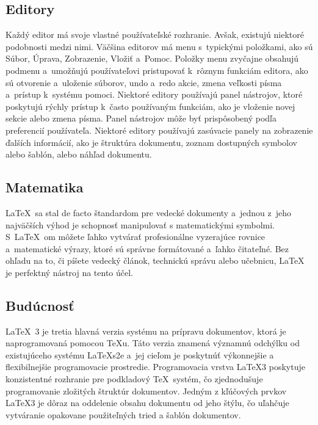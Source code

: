 \documentclass[a4paper, 11pt]{article}
\begin{document}
\subsection{Editory}
Každý editor má svoje vlastné používateľské rozhranie. Avšak, existujú niektoré podobnosti medzi nimi. Väčšina editorov má menu s~typickými položkami, ako sú Súbor, Úprava, Zobrazenie, Vložiť a~Pomoc. Položky menu zvyčajne obsahujú podmenu a~umožňujú používateľovi pristupovať k~rôznym funkciám editora, ako sú otvorenie a~uloženie súborov, undo a~redo akcie, zmena veľkosti písma a~prístup k~systému pomoci. Niektoré editory používajú panel nástrojov, ktoré poskytujú rýchly prístup k~často používaným funkciám, ako je vloženie novej sekcie alebo zmena písma. Panel nástrojov môže byť prispôsobený podľa preferencií používateľa. Niektoré editory používajú zasúvacie panely na zobrazenie ďalších informácií, ako je štruktúra dokumentu, zoznam dostupných symbolov alebo šablón, alebo náhľad dokumentu. \cite{HorejsiTomas2017}


\subsection{Matematika}
\LaTeX \ sa stal de facto štandardom pre vedecké dokumenty a~jednou z~jeho najväčších výhod je schopnosť manipulovať s matematickými symbolmi. S~\LaTeX \ om môžete ľahko vytvárať profesionálne vyzerajúce rovnice a~matematické výrazy, ktoré sú správne formátované a~ľahko čitateľné. Bez ohľadu na to, či píšete vedecký článok, technickú správu alebo učebnicu, LaTeX je perfektný nástroj na tento účel. \cite{WeiserTexMatematics}

\subsection{Budúcnosť}
\LaTeX \ 3 je tretia hlavná verzia systému na prípravu dokumentov, ktorá je naprogramovaná pomocou TeXu. Táto verzia znamená významnú odchýlku od existujúceho systému \LaTeX s2e a~jej cieľom je poskytnúť výkonnejšie a flexibilnejšie programovacie prostredie. Programovacia vrstva \LaTeX 3 poskytuje konzistentné rozhranie pre podkladový \TeX \ systém, čo zjednodušuje programovanie zložitých štruktúr dokumentov. Jedným z kľúčových prvkov \LaTeX 3 je dôraz na oddelenie obsahu dokumentu od jeho štýlu, čo uľahčuje vytváranie opakovane použiteľných tried a šablón dokumentov. \cite{LATEX3}

\newpage

\renewcommand{\refname}{Literatúra}

\end{document}
